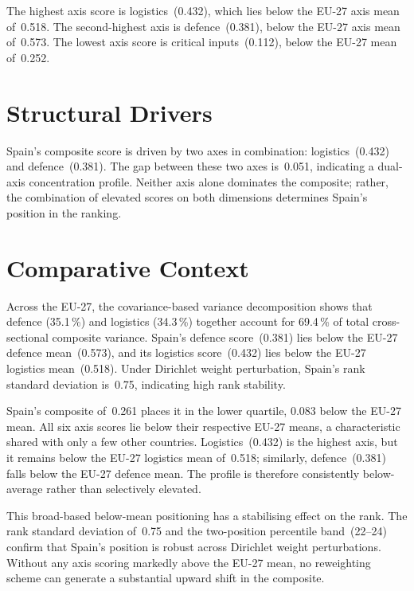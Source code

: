 \documentclass[12pt,a4paper]{article}
\begin{document}
The highest axis score is logistics~(0.432), which lies below the EU-27 axis mean of~0.518.  The second-highest axis is defence~(0.381), below the EU-27 axis mean of~0.573.  The lowest axis score is critical inputs~(0.112), below the EU-27 mean of~0.252.


\section{Structural Drivers}
\label{sec:drivers}

\begin{sloppypar}
Spain's composite score is driven by two axes in combination: logistics~(0.432) and defence~(0.381).  The gap between these two axes is~0.051, indicating a dual-axis concentration profile.  Neither axis alone dominates the composite; rather, the combination of elevated scores on both dimensions determines Spain's position in the ranking.
\end{sloppypar}


\section{Comparative Context}
\label{sec:comparative}

Across the EU-27, the covariance-based variance decomposition shows that defence (35.1\,\%) and logistics (34.3\,\%) together account for 69.4\,\% of total cross-sectional composite variance.  Spain's defence score~(0.381) lies below the EU-27 defence mean~(0.573), and its logistics score~(0.432) lies below the EU-27 logistics mean~(0.518).  Under Dirichlet weight perturbation, Spain's rank standard deviation is~0.75, indicating high rank stability.



Spain's composite of~0.261 places it in the lower quartile, 0.083 below the EU-27 mean.  All six axis scores lie below their respective EU-27 means, a characteristic shared with only a few other countries.  Logistics~(0.432) is the highest axis, but it remains below the EU-27 logistics mean of~0.518; similarly, defence~(0.381) falls below the EU-27 defence mean.  The profile is therefore consistently below-average rather than selectively elevated.

This broad-based below-mean positioning has a stabilising effect on the rank.  The rank standard deviation of~0.75 and the two-position percentile band~(22--24) confirm that Spain's position is robust across Dirichlet weight perturbations.  Without any axis scoring markedly above the EU-27 mean, no reweighting scheme can generate a substantial upward shift in the composite.
\end{document}
